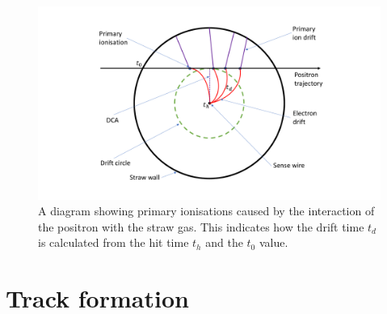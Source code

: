 \begin{figure}[th]
\centering
\includegraphics[scale=0.4]{Figures/driftstraw.pdf}
\decoRule
\caption{A diagram showing primary ionisations caused by the interaction of the positron with the straw gas.  This indicates how the drift time $t_{d}$ is calculated from the hit time $t_{h}$ and the $t_{0}$ value.}
\label{fig:driftstraw}
\end{figure}

\section{Track formation}

